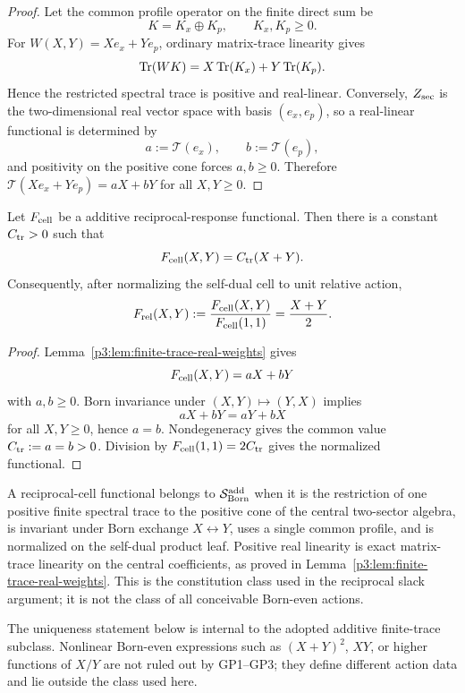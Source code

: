 \documentclass[12pt,a4paper]{article}
\begin{document}
\begin{proof}
Let the common profile operator on the finite direct sum be
\[
        K=K_x\oplus K_p,
        \qquad K_x,K_p\ge0.
\]
For \(W(X,Y)=Xe_x+Ye_p\), ordinary matrix-trace linearity gives
\[
\operatorname{Tr}(WK)
 =X\operatorname{Tr}(K_x)+Y\operatorname{Tr}(K_p).
\]
Hence the restricted spectral trace is positive and real-linear.  Conversely,
\(Z_{\rm sec}\) is the two-dimensional real vector space with basis
\((e_x,e_p)\), so a real-linear functional is determined by
\[
        a:=\mathcal T(e_x),
        \qquad b:=\mathcal T(e_p),
\]
and positivity on the positive cone forces \(a,b\ge0\).  Therefore
\(\mathcal T(Xe_x+Ye_p)=aX+bY\) for all \(X,Y\ge0\).
\end{proof}


\begin{lemma}
\label{p3:lem:pre-realization-linear}
Let \(F_{\rm cell}\) be a additive reciprocal-response functional.  Then
there is a constant \(C_{\rm tr}>0\) such that
\[
        F_{\rm cell}(X,Y)=C_{\rm tr}(X+Y).
\]
Consequently, after normalizing the self-dual cell to unit relative action,
\[
        F_{\rm rel}(X,Y)
        :=\frac{F_{\rm cell}(X,Y)}{F_{\rm cell}(1,1)}
        =\frac{X+Y}{2}.
\]
\end{lemma}

\begin{proof}
Lemma~\ref{p3:lem:finite-trace-real-weights} gives
\[
        F_{\rm cell}(X,Y)=aX+bY
\]
with \(a,b\ge0\).  Born invariance under \((X,Y)\mapsto(Y,X)\) implies
\[
        aX+bY=aY+bX
\]
for all \(X,Y\ge0\), hence \(a=b\).  Nondegeneracy gives the common value
\(C_{\rm tr}:=a=b>0\).  Division by
\(F_{\rm cell}(1,1)=2C_{\rm tr}\) gives the normalized
functional.
\end{proof}


\begin{definition}
\label{p3:def:minimal-additive-born-functional}
A reciprocal-cell functional belongs to \(\mathcal S_{\rm Born}^{\rm add}\) when it is the restriction of one positive finite spectral trace to the positive cone of the central two-sector algebra, is invariant under Born exchange \(X\leftrightarrow Y\), uses a single common profile, and is normalized on the self-dual product leaf.  Positive real linearity is exact matrix-trace linearity on the central coefficients, as proved in Lemma~\ref{p3:lem:finite-trace-real-weights}.  This is the constitution class used in the reciprocal slack argument; it is not the class of all conceivable Born-even actions.
\end{definition}
\begin{remark}
The uniqueness statement below is internal to the adopted additive
finite-trace subclass.  Nonlinear Born-even expressions such as
\((X+Y)^2\), \(XY\), or higher functions of \(X/Y\) are not ruled out by
GP1--GP3; they define different action data and lie outside the class used
here.
\end{remark}
\end{document}
